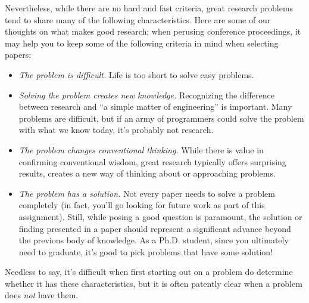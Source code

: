 Nevertheless, while there are no hard and fast criteria, great research
problems tend to share many of the following characteristics.  Here are
some of our thoughts on what makes good research; when perusing
conference proceedings, it may help you to keep some of the following
criteria in mind when selecting papers:
\begin{itemize}
\item {\em The problem is difficult.}  Life is too short to solve easy
  problems. 
\item {\em Solving the problem creates new knowledge.} Recognizing the
  difference between research and ``a simple matter of engineering'' is
  important.  Many problems are difficult, but if an army of programmers
  could solve the problem with what we know today, it's probably not
  research.
\item {\em The problem changes conventional thinking.} While there is
  value in confirming conventional wisdom, great research typically
  offers surprising results, creates a new way of thinking about or
  approaching problems.
\item {\em The problem has a solution.} Not every paper needs to solve a
  problem completely (in fact, you'll go looking for future work as part
  of this assignment).  Still, while posing a good question is
  paramount, the solution or finding presented in a paper should
  represent a significant advance beyond the previous body of
  knowledge.  As a Ph.D. student, since you ultimately need to graduate,
  it's good to pick problems that have some solution!
\end{itemize}
\noindent
Needless to say, it's difficult when first starting out on a problem do
determine whether it has these characteristics, but it is often patently
clear when a problem does {\em not} have them.

